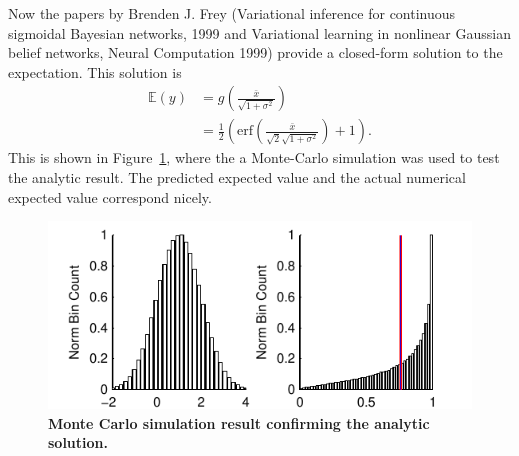 \documentclass[]{article}
\begin{document}
Now the papers by Brenden J. Frey (Variational inference for continuous sigmoidal Bayesian networks, 1999 and Variational learning in nonlinear Gaussian belief networks, Neural Computation 1999) provide a closed-form solution to the expectation. This solution is
\begin{align}
	\mathbb{E}(y) &= g\left(\frac{\bar{x}}{\sqrt{1+\sigma^2}}\right) \\
	&= \frac{1}{2}\left(\mathrm{erf}\left(\frac{\bar{x}}{\sqrt{2}\sqrt{1+\sigma^2}}\right)+1\right).
\end{align}
This is shown in Figure~\ref{fig:MappingThroughERF}, where the a Monte-Carlo simulation was used to test the analytic result. The predicted expected value and the actual numerical expected value correspond nicely.
\begin{figure}[!ht]
	\centering
		\includegraphics[scale=1]{./Figures/pdf/MappingThroughERF.pdf}
	\caption{\textbf{Monte Carlo simulation result confirming the analytic solution.}}
	\label{fig:MappingThroughERF}
\end{figure}
\end{document}
